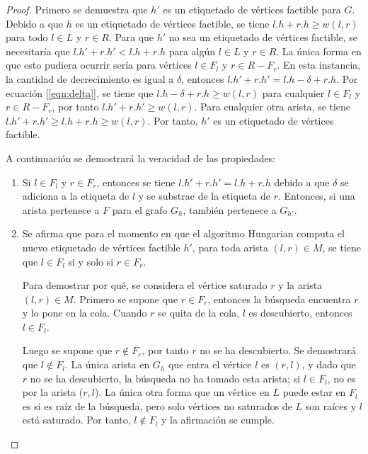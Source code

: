 \documentclass[10pt]{article} %
\begin{document}
	\begin{proof}
		Primero se demuestra que $h'$ es un etiquetado de v\'ertices factible para $G$. Debido a que $h$ es un etiquetado de v\'ertices factible, se tiene $l.h + r.h \geq w(l,r)$ para todo $l \in L$ y $r \in R$. Para que $h'$ no sea un etiquetado de v\'ertices factible, se necesitar\'ia que $l.h' + r.h' < l.h + r.h$ para alg\'un $l \in L$ y $r \in R$. La \'unica forma en que esto pudiera ocurrir ser\'ia para v\'ertices $l \in F_l$ y $r \in R-F_r$. En esta instancia, la cantidad de decrecimiento es igual a $\delta$, entonces $l.h' + r.h' = l.h - \delta + r.h$. Por ecuaci\'on [\ref{eqn:delta}], se tiene que $l.h - \delta + r.h \geq w(l,r)$ para cualquier $l \in F_l$ y $r \in R - F_r$, por tanto $l.h' + r.h' \geq w(l,r)$. Para cualquier otra arista, se tiene $l.h' + r.h' \geq l.h + r.h \geq w(l,r)$. Por tanto, $h'$ es un etiquetado de v\'ertices factible.
		
		A continuaci\'on se demostrar\'a la veracidad de las propiedades:
		
		\begin{enumerate}
			\item Si $l \in F_l$ y $r \in F_r$, entonces se tiene $l.h' + r.h' = l.h + r.h$ debido a que $\delta$ se adiciona a la etiqueta de $l$ y se substrae de la etiqueta de $r$. Entonces, si una arista pertenece a $F$ para el grafo $G_h$, tambi\'en pertenece a $G_{h'}$.
			\item Se afirma que para el momento en que el algoritmo Hungarian computa el nuevo etiquetado de v\'ertices factible $h'$, para toda arista $(l,r) \in M$, se tiene que $l \in F_l$ si y solo si $r \in F_r$. 
			
			Para demostrar por qu\'e, se considera el v\'ertice saturado $r$ y la arista $(l,r) \in M$. Primero se supone que $r \in F_r$, entonces la b\'usqueda encuentra $r$ y lo pone en la cola. Cuando $r$ se quita de la cola, $l$ es descubierto, entonces $l \in F_l$. 
			
			Luego se supone que $r \notin F_r$, por tanto $r$ no se ha descubierto. Se demostrar\'a que $l \notin F_l$. La \'unica arista en $G_h$ que entra el v\'ertice $l$ es $(r,l)$, y dado que $r$ no se ha descubierto, la b\'usqueda no ha tomado esta arista; si $l \in F_l$, no es por la arista ($r,l$). La \'unica otra forma que un v\'ertice en $L$ puede estar en $F_l$ es si es ra\'iz de la b\'usqueda, pero solo v\'ertices no saturados de $L$ son ra\'ices y $l$ est\'a saturado. Por tanto, $l \notin F_l$ y la afirmaci\'on se cumple.
			

\end{enumerate}
\end{proof}
\end{document}
